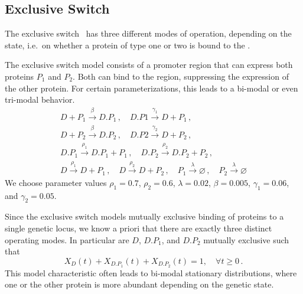 
\subsection{Exclusive Switch}
The exclusive switch~\parencite{barzel2008calculation}  has three different modes of operation, depending on the
 state, i.e.\ on whether a protein of type one or two is bound to
the .

\begin{model}\label{model:excl_switch}
The exclusive switch model consists of a promoter region
that can express both proteins $P_1$ and $P_2$. Both can bind to the region, suppressing
the expression of the other protein. For certain parameterizations, this leads to a
bi-modal or even tri-modal behavior.
\begin{gather*}
	D + P_1 \xrightarrow{\beta} D.P_1\,,\quad
	D.P1 \xrightarrow{\gamma_1} D + P_1  \,,\\
	D + P_2 \xrightarrow{\beta} D.P_2 \,,\quad
	D.P2 \xrightarrow{\gamma_2} D + P_2 \,,\\
	D.P_1 \xrightarrow{\rho_1} D.P_1 + P_1\,, \quad
    D.P_2 \xrightarrow{\rho_2} D.P_2 + P_2\,,\\
	D \xrightarrow{\rho_1} D + P_1\,,\quad
	D \xrightarrow{\rho_2} D + P_2\,,  \quad
	P_1 \xrightarrow{\lambda}\varnothing  \,,\quad
    P_2\xrightarrow{\lambda} \varnothing
\end{gather*}
We choose parameter values $\rho_1 = 0.7$, $\rho_2 = 0.6$, $\lambda=0.02$, $\beta=0.005$, $\gamma_1 = 0.06$, and $\gamma_2 = 0.05$.
\end{model}
Since the exclusive switch models mutually exclusive binding of proteins to a single genetic locus,
we know a priori that there are exactly three distinct operating modes.
In particular are $D$, $D.P_1$, and $D.P_2$ mutually exclusive such that \[X_{D}(t) + X_{D.P_1}(t) + X_{D.P_2}(t) = 1, \quad \forall t\geq 0\,.\]
This model characteristic often leads to bi-modal stationary distributions, where one or the other protein is more abundant depending on the genetic state.

